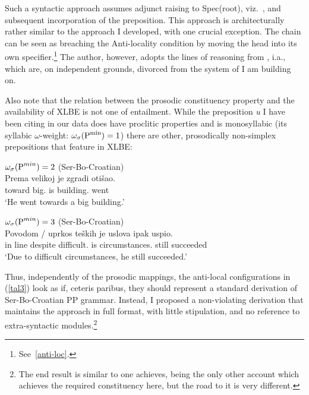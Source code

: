 \documentclass[output=paper]{langsci/langscibook}
\begin{document}
Such a syntactic approach assumes adjunct raising to Spec(root), viz.\
, and subsequent incorporation of
the preposition. This approach is architecturally rather similar to the
approach I developed, with one crucial exception. The chain
 can be seen as breaching the
Anti-locality condition by moving the head into its own
specifier.\footnote{See~\cref{anti-loc}.} The author, however, adopts the lines
of reasoning from \citet{Matushansky:2006}, i.a., which are, on independent
grounds, divorced from the system of \citet{Roberts2010,roberts:2012uq} I am
building on.

Also note that the relation between the prosodic constituency property and the
availability of XLBE is not one of entailment. While the preposition \emph{u} I
have been citing in our data does have proclitic properties and is monosyllabic
(its syllabic $\omega$-weight: $\omega_\sigma(\textup{P}^{\text{min}})=1$)
there are other, prosodically non-simplex prepositions that feature in XLBE:

\begin{exe}
    \ex $\omega_\sigma(\textup{P}^{min})=2$
    (Ser-Bo-Croatian)\\
	\gll Prema velikoj je zgradi otišao.\\
	toward big.\Loc{} is building.\Loc{} went\\
	\trans `He went towards a big building.'

	\ex $\omega_\sigma(\textup{P}^{min})=3$
    (Ser-Bo-Croatian)\\
	\gll Povodom / uprkos teških je uslova ipak uspio. \\
        {in line} {} despite difficult.\Gen{} is circumstances.\Gen{} still succeeded \\
	\trans `Due to difficult circumstances, he still succeeded.'
\end{exe}

Thus, independently of the prosodic mappings, the anti-local configurations in
(\ref{tal3}) look as if, ceteris paribus, they should represent a standard
derivation of Ser-Bo-Croatian\il{Serbo-Croatian} PP grammar. Instead, I
proposed a non-violating derivation that maintains the approach in full format,
with little stipulation, and no reference to extra-syntactic
modules.\footnote{The end result is similar to one \citet{Boskovic:2005}
    achieves, being the only other account which achieves the required
constituency here, but the road to it is very different.}
\end{document}
